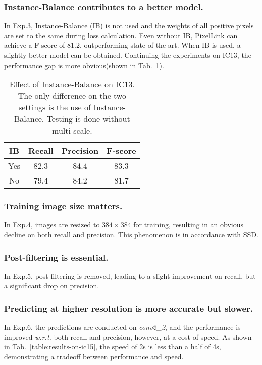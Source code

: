 \documentclass[letterpaper]{article} \usepackage{aaai18}  \usepackage{times}  \usepackage{helvet}  \usepackage{courier}  \usepackage{url}  \usepackage{graphicx}
\begin{document}
	\subsubsection{Instance-Balance contributes to a better model.}
	In Exp.3, Instance-Balance (IB) is not used and the weights of all positive pixels are set to the same during loss calculation. Even without IB, PixelLink can achieve a F-score of 81.2, outperforming state-of-the-art. When IB is used, a slightly better model can be obtained. Continuing the experiments on IC13, the performance gap is more obvious(shown in Tab.~\ref{table:ib-on-ic13}).  
	\begin{table}
		\caption{Effect of Instance-Balance on IC13. The only difference on the two settings is the use of Instance-Balance. Testing is done without multi-scale.}
		\label{table:ib-on-ic13}
		\centering
		\begin{tabular}{|c|c|c|c|}
			\hline
			IB  &Recall     &Precision      &F-score \\ \hline \hline
			Yes &82.3       &84.4           &83.3 \\ \hline
			No  &79.4       &84.2           &81.7 \\ \hline
		\end{tabular}
	\end{table}
	\subsubsection{Training image size matters.}
	In Exp.4, images are resized to $384\times 384$ for training, resulting in an obvious decline on both recall and precision. This phenomenon is in accordance with SSD.
	\subsubsection{Post-filtering is essential.}
	In Exp.5, post-filtering is removed, leading to a slight improvement on recall, but a significant drop on precision.
	\subsubsection{Predicting at higher resolution is more accurate but slower.}
	In Exp.6, the predictions are conducted on \emph{conv2\_2}, and the performance is improved \emph{\mbox{w.r.t.}} both recall and precision, however, at a cost of speed. As shown in Tab.~\ref{table:results-on-ic15}, the speed of 2s is less than a half of 4s, demonstrating a tradeoff between performance and speed.
	
\end{document}
